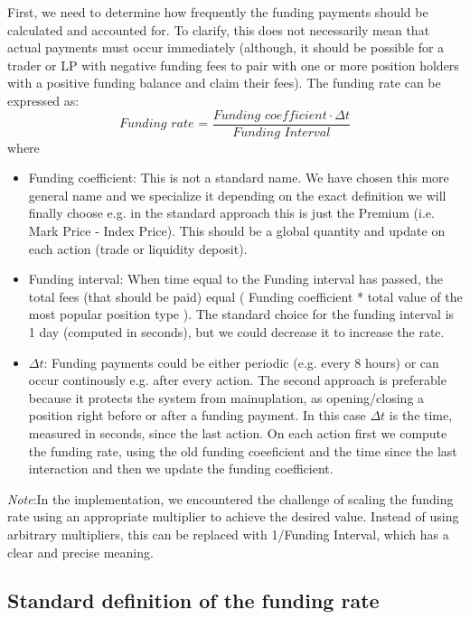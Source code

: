 \documentclass{article}
\begin{document}
First, we need to determine how frequently the funding payments should be calculated and accounted for. To clarify, this does not necessarily mean that actual payments must occur immediately (although, it should be possible for a trader or LP with negative funding fees to pair with one or more position holders with a positive funding balance and claim their fees).
The funding rate can be expressed as:
\begin{equation}
\textit{Funding rate = }\frac{\textit{Funding coefficient}\cdot \Delta t}{\textit{Funding Interval}} 
\end{equation}
where
\begin{itemize}
\item Funding coefficient: This is not a standard name. We have chosen this more general name and we specialize it depending on the exact definition we will finally choose e.g. in the standard approach this is just the Premium (i.e. Mark Price - Index Price). This should be a global quantity and update on each action (trade or liquidity deposit).
\item Funding interval: When time equal to the Funding interval has passed, the total fees (that should be paid) equal ( Funding coefficient * total value of the most popular position type ). The standard choice for the funding interval is 1 day (computed in seconds), but we could decrease it to increase the rate.
\item $\Delta t$: Funding payments could be either periodic (e.g. every 8 hours) or can occur continously e.g. after every action. The second approach is preferable because it protects the system from mainuplation, as opening/closing a position right before or after a funding payment. In this case $\Delta t$ is the time, measured in seconds, since the last action.
On each action first we compute the funding rate, using the old funding coeeficient and the time since the last interaction and then we update the  funding coefficient. 
\end{itemize}

\textit{Note}:In the implementation, we encountered the challenge of scaling the funding rate using an appropriate multiplier to achieve the desired value. Instead of using arbitrary multipliers, this can be replaced with 1/Funding Interval, which has a clear and precise meaning.


\subsection{Standard definition of the funding rate}
\end{document}
